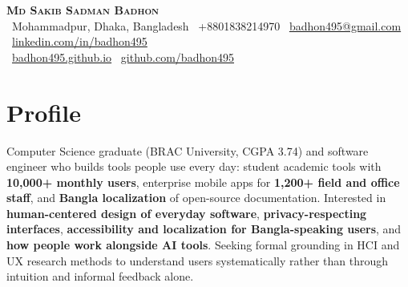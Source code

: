 \documentclass[a4paper]{article}
\begin{document}
\begin{center}
    \textbf{\Huge \scshape Md Sakib Sadman Badhon} \\ \vspace{4pt}
    \faMapMarker*~Mohammadpur, Dhaka, Bangladesh \enspace
    ~+8801838214970 \enspace
    \faEnvelope~\href{mailto:badhon495@gmail.com}{badhon495@gmail.com} \enspace
    \faLinkedin~\href{https://linkedin.com/in/badhon495/}{linkedin.com/in/badhon495} \\ \vspace{4pt}
    \faGlobe~\href{https://badhon495.github.io/}{badhon495.github.io} \enspace
    \faGithub~\href{https://github.com/badhon495}{github.com/badhon495} \enspace
\end{center}


\section{Profile}
\begin{itemize}[leftmargin=0.15in, label={}]
\small{\item{
Computer Science graduate (BRAC University, CGPA 3.74) and software engineer who builds tools people use every day: student academic tools with \textbf{10,000+ monthly users}, enterprise mobile apps for \textbf{1,200+ field and office staff}, and \textbf{Bangla localization} of open-source documentation. Interested in \textbf{human-centered design of everyday software}, \textbf{privacy-respecting interfaces}, \textbf{accessibility and localization for Bangla-speaking users}, and \textbf{how people work alongside AI tools}. Seeking formal grounding in HCI and UX research methods to understand users systematically rather than through intuition and informal feedback alone.
}}
\end{itemize}


\end{document}
